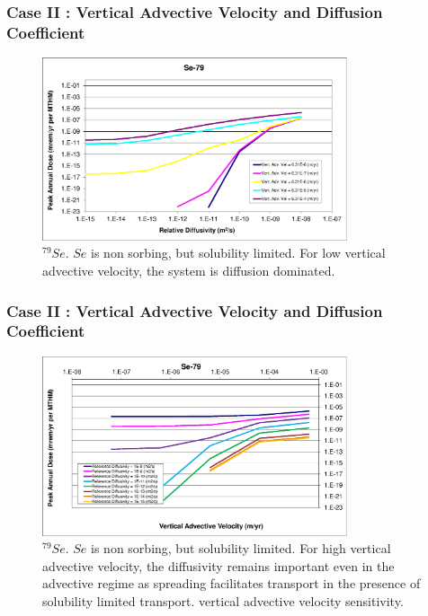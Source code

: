 \begin{frame}[c]
  \frametitle{Case II : Vertical Advective Velocity and Diffusion Coefficient}
\begin{figure}[htp!]
\centering
\includegraphics[width=0.8\textwidth]{AdvVelAndDiffCoeffEBSFail/Se-79.eps}
\caption{$^{79}Se$.
$Se$ is non sorbing, but solubility limited.  
For low vertical advective velocity, 
the system is diffusion dominated.}
\label{fig:VAdvVelSe79}
\end{figure}
\end{frame}

\begin{frame}[c]
  \frametitle{Case II : Vertical Advective Velocity and Diffusion Coefficient}
\begin{figure}[ht!]
\centering
\includegraphics[width=0.8\textwidth]{AdvVelAndDiffCoeffEBSFail/Se-79-VAdvVel.eps}
\caption{$^{79}Se$.
$Se$ is non sorbing, but solubility limited.  
For high vertical advective 
velocity, the diffusivity remains important even in the advective regime as 
spreading facilitates transport in the presence of solubility limited transport. 
vertical advective velocity sensitivity.}
\label{fig:VAdvVelSe79VAdvVel}
\end{figure}
\end{frame}

